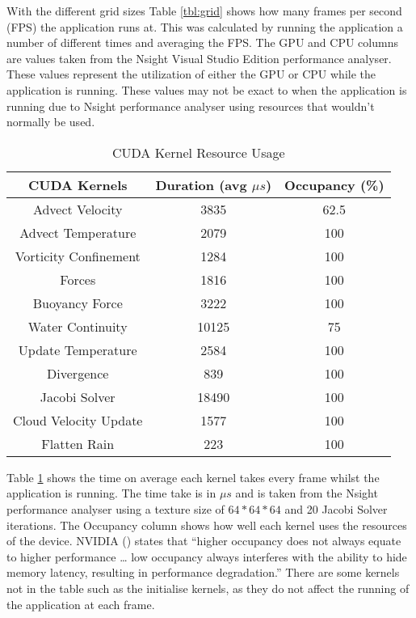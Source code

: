 With the different grid sizes Table \ref{tbl:grid} shows how many frames per second (FPS) the application runs at.
This was calculated by running the application a number of different times and averaging the FPS.
The GPU and CPU columns are values taken from the Nsight Visual Studio Edition performance analyser.
These values represent the utilization of either the GPU or CPU while the application is running.
These values may not be exact to when the application is running due to Nsight performance analyser using resources that wouldn't normally be used.

\begin{table}[h]
\centering
\centering\caption{CUDA Kernel Resource Usage}
\label{tbl:ck}
    \begin{tabular}{c|cc}
    \bf{CUDA Kernels} & \bf{Duration} (avg $\mu s$) & \bf{Occupancy} (\%) \\ \hline\hline
    Advect Velocity        & 3835                         & 62.5           \\
    Advect Temperature     & 2079                         & 100            \\
    Vorticity Confinement  & 1284                         & 100            \\
    Forces				   & 1816                         & 100            \\
    Buoyancy Force         & 3222                         & 100            \\
    Water Continuity       & 10125                        & 75             \\
    Update Temperature     & 2584                         & 100            \\
    Divergence             & 839                          & 100            \\
    Jacobi Solver          & 18490                        & 100            \\
    Cloud Velocity Update  & 1577                         & 100            \\
    Flatten Rain  		   & 223                          & 100            \\
    \end{tabular}
\end{table}

Table \ref{tbl:ck} shows the time on average each kernel takes every frame whilst the application is running.
The time take is in $\mu s$ and is taken from the Nsight performance analyser using a texture size of $64*64*64$ and 20 Jacobi Solver iterations.
The Occupancy column shows how well each kernel uses the resources of the device.
NVIDIA (\citeyear{nvsns2012}) states that “higher occupancy does not always equate to higher performance … low occupancy always interferes with the ability to hide memory latency, resulting in performance degradation.”
There are some kernels not in the table such as the initialise kernels, as they do not affect the running of the application at each frame.

